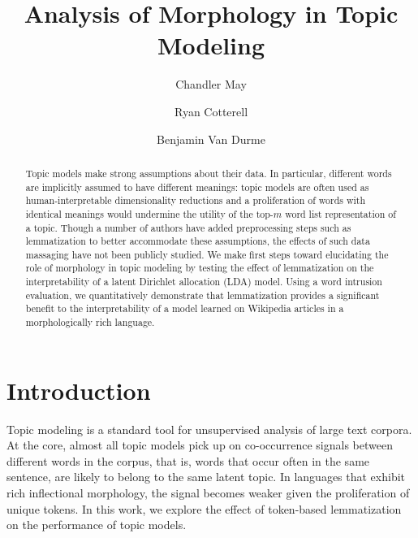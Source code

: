 \documentclass{clv2}
\begin{document}
\title{Analysis of Morphology in Topic Modeling}

\author{Chandler May}

\author{Ryan Cotterell}

\author{Benjamin Van Durme}

\maketitle

\begin{abstract}
    Topic models make strong assumptions about their data.  In
    particular, different words are implicitly assumed to
    have different meanings: topic models are often used as
    human-interpretable dimensionality reductions and a proliferation
    of words with identical meanings would undermine the utility of the
    top-$m$ word list representation of a topic.  Though a number
    of authors have added preprocessing steps such as lemmatization to
    better accommodate these assumptions, the effects of such data
    massaging have not been publicly studied.  We make first steps
    toward elucidating the role of morphology in topic modeling by
    testing the effect of lemmatization on the interpretability of a
    latent Dirichlet allocation (LDA) model.  Using a word intrusion
    evaluation, we quantitatively demonstrate that lemmatization
    provides a significant benefit to the interpretability of a model
    learned on Wikipedia articles in a morphologically rich language.
\end{abstract}


\section{Introduction}\label{sec:introduction}

Topic modeling is a standard tool for unsupervised analysis of large
text corpora. At the core, almost all topic models pick up on
co-occurrence signals between different words in the corpus, that is,
words that occur often in the same sentence, are likely to belong to
the same latent topic. In languages that exhibit rich inflectional
morphology, the signal becomes weaker given the proliferation of
unique tokens. In this work, we explore the effect of token-based
lemmatization on the performance of topic models.
\end{document}

